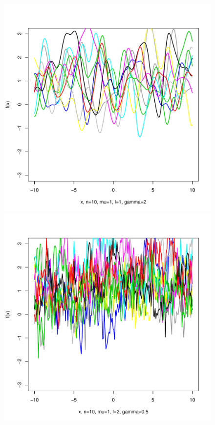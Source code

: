 \documentclass[12pt,letterpaper]{article}
\begin{document}
\begin{figure}
\begin{center}
\includegraphics[scale=0.2]{hw321/n10-m1-l1-g4.pdf}
\includegraphics[scale=0.2]{hw321/n10-m1-l2-g1.pdf}

\end{center}
\end{figure}
\end{document}
